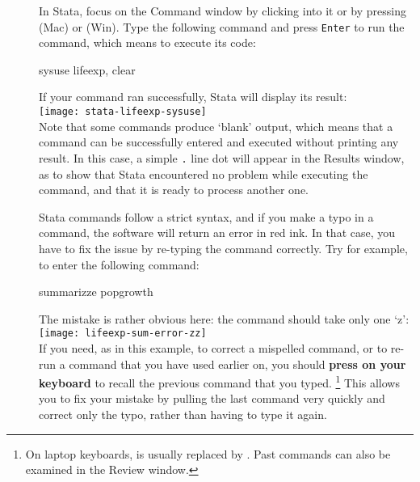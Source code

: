 		\begin{description}
			\item[]%
			\vspace{1em}%
			In Stata, focus on the Command window by clicking into it or by pressing  (Mac) or (Win). Type the following command and press \texttt{Enter} to run the command, which means to execute its code:%
			
		\begin{docspec}%
			\label{lifeexp}%
			sysuse lifeexp, clear
		\end{docspec}
			
		If your command ran successfully, Stata will display its result:\\[1em]
			
			\texttt{[image: stata-lifeexp-sysuse]}\\[1em]

		Note that some commands produce `blank' output, which means that a command can be successfully entered and executed without printing any result. In this case, a simple \texttt{.} line dot will appear in the Results window, as to show that Stata encountered no problem while executing the command, and that it is ready to process another one.%

			\item[] %
		Stata commands follow a strict syntax, and if you make a typo in a command, the software will return an error in red ink. In that case, you have to fix the issue by re-typing the command correctly. Try for example, to enter the following command:%
			
			\begin{docspec}
				summarizze popgrowth
			\end{docspec}
			
			The mistake is rather obvious here: the  command should take only one `z':\\[1em]%
			
			\texttt{[image: lifeexp-sum-error-zz]}\\[1em]
			
			If you need, as in this example, to correct a mispelled command, or to re-run a command that you have used earlier on, you should \textbf{press  on your keyboard} to recall the previous command that you typed.%
			\footnote{On laptop keyboards,  is usually replaced by . Past commands can also be examined in the Review window.} %
			This allows you to fix your mistake by pulling the last command very quickly and correct only the typo, rather than having to type it again.%


\end{description}
